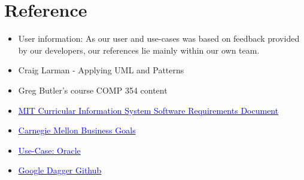 \documentclass[12pt]{article}
\begin{document}
\clearpage

\section{Reference}

\begin{itemize}
\item User information: As our user and use-cases was based on feedback provided by our developers, our references lie mainly within our own team.
\item Craig Larman - Applying UML and Patterns
\item Greg Butler's course COMP 354 content
\item \href{http://web.mit.edu/ssit/cis/CISRequirements.html}{\textcolor{blue}{MIT Curricular Information System
Software Requirements Document}}
\item \href{https://resources.sei.cmu.edu/asset_files/TechnicalReport/2005_005_001_14621.pdf}{\textcolor{blue}{Carnegie Mellon Business Goals}}
\item \href{http://www.oracle.com/technetwork/testcontent/gettingstartedwithusecasemodeling-133857.pdf}{\textcolor{blue}{Use-Case: Oracle }}
\item \href{https://github.com/google/dagger}{\textcolor{blue}{Google Dagger Github}}

\end{itemize}
\end{document}
